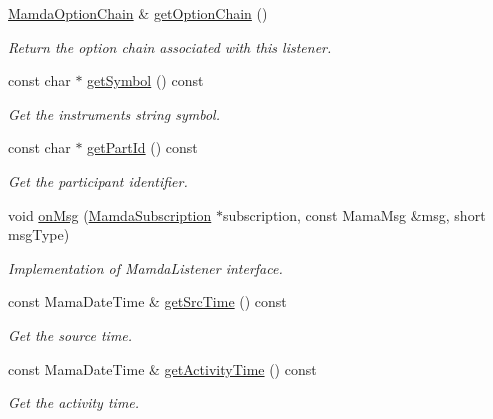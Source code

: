 \begin{CompactItemize}
\hyperlink{classWombat_1_1MamdaOptionChain}{Mamda\-Option\-Chain} \& \hyperlink{classWombat_1_1MamdaOptionChainListener_0cf73723053cf9ba983f7a156d2fa1ae}{get\-Option\-Chain} ()
\begin{CompactList}\small\item\em Return the option chain associated with this listener. \item\end{CompactList}\item 
const char $\ast$ \hyperlink{classWombat_1_1MamdaOptionChainListener_74e03d49241666a1670a07e4187bf955}{get\-Symbol} () const 
\begin{CompactList}\small\item\em Get the instruments string symbol. \item\end{CompactList}\item 
const char $\ast$ \hyperlink{classWombat_1_1MamdaOptionChainListener_742fc512426cd4b38cdddc67747ea269}{get\-Part\-Id} () const 
\begin{CompactList}\small\item\em Get the participant identifier. \item\end{CompactList}\item 
void \hyperlink{classWombat_1_1MamdaOptionChainListener_c708f2e0adbf7309762ea71632e80b71}{on\-Msg} (\hyperlink{classWombat_1_1MamdaSubscription}{Mamda\-Subscription} $\ast$subscription, const Mama\-Msg \&msg, short msg\-Type)
\begin{CompactList}\small\item\em Implementation of Mamda\-Listener interface. \item\end{CompactList}\item 
const Mama\-Date\-Time \& \hyperlink{classWombat_1_1MamdaOptionChainListener_7efc05e17f323d3b3fe4da601048886b}{get\-Src\-Time} () const 
\begin{CompactList}\small\item\em Get the source time. \item\end{CompactList}\item 
const Mama\-Date\-Time \& \hyperlink{classWombat_1_1MamdaOptionChainListener_4a54b34d8e87413ea30e83b8e75d9d78}{get\-Activity\-Time} () const 
\begin{CompactList}\small\item\em Get the activity time. \item\end{CompactList}\item 

\end{CompactItemize}
